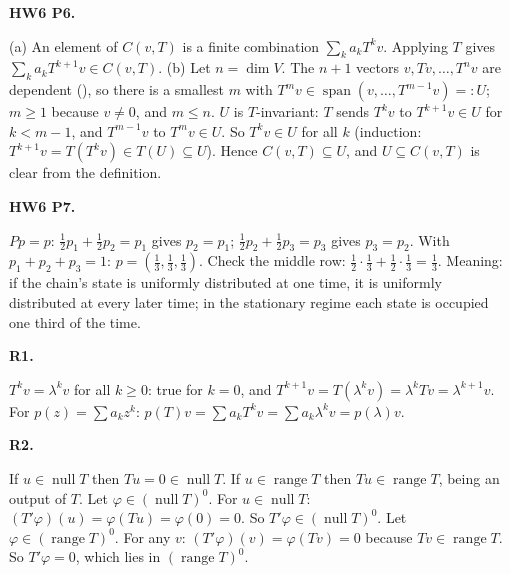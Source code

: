 \documentclass[10pt]{scrartcl}
\DeclareMathOperator{\spn}{span}\DeclareMathOperator{\nul}{null}\DeclareMathOperator{\range}{range}
\begin{document}
\begin{prob}\textbf{HW6 P6.}\par{}
\begin{steps}
  \ii (a) An element of $C(v,T)$ is a finite combination $\sum_ka_kT^kv$. Applying $T$ gives $\sum_ka_kT^{k+1}v\in C(v,T)$.
  \ii (b) Let $n=\dim V$. The $n+1$ vectors $v,Tv,\dots,T^nv$ are dependent (), so there is a smallest $m$ with $T^mv\in\spn(v,\dots,T^{m-1}v)=:U$; $m\ge1$ because $v\ne0$, and $m\le n$.
  \ii $U$ is $T$-invariant: $T$ sends $T^kv$ to $T^{k+1}v\in U$ for $k<m-1$, and $T^{m-1}v$ to $T^mv\in U$.
  \ii So $T^kv\in U$ for all $k$ (induction: $T^{k+1}v=T(T^kv)\in T(U)\subseteq U$). Hence $C(v,T)\subseteq U$, and $U\subseteq C(v,T)$ is clear from the definition.
\end{steps}
\end{prob}

\begin{prob}\textbf{HW6 P7.}\par{}
\begin{steps}
  \ii $Pp=p$: $\frac12p_1+\frac12p_2=p_1$ gives $p_2=p_1$; $\frac12p_2+\frac12p_3=p_3$ gives $p_3=p_2$.
  \ii With $p_1+p_2+p_3=1$: $p=(\frac13,\frac13,\frac13)$. Check the middle row: $\frac12\cdot\frac13+\frac12\cdot\frac13=\frac13$.
  \ii Meaning: if the chain's state is uniformly distributed at one time, it is uniformly distributed at every later time; in the stationary regime each state is occupied one third of the time.
\end{steps}
\end{prob}

\begin{prob}\textbf{R1.}\par{}
\begin{steps}
  \ii $T^kv=\lambda^kv$ for all $k\ge0$: true for $k=0$, and $T^{k+1}v=T(\lambda^kv)=\lambda^kTv=\lambda^{k+1}v$.
  \ii For $p(z)=\sum a_kz^k$: $p(T)v=\sum a_kT^kv=\sum a_k\lambda^kv=p(\lambda)v$.
\end{steps}
\end{prob}

\begin{prob}\textbf{R2.}\par{}
\begin{steps}
  \ii If $u\in\nul T$ then $Tu=0\in\nul T$. If $u\in\range T$ then $Tu\in\range T$, being an output of $T$.
  \ii Let $\varphi\in(\nul T)^0$. For $u\in\nul T$: $(T'\varphi)(u)=\varphi(Tu)=\varphi(0)=0$. So $T'\varphi\in(\nul T)^0$.
  \ii Let $\varphi\in(\range T)^0$. For any $v$: $(T'\varphi)(v)=\varphi(Tv)=0$ because $Tv\in\range T$. So $T'\varphi=0$, which lies in $(\range T)^0$.
\end{steps}
\end{prob}
\end{document}
